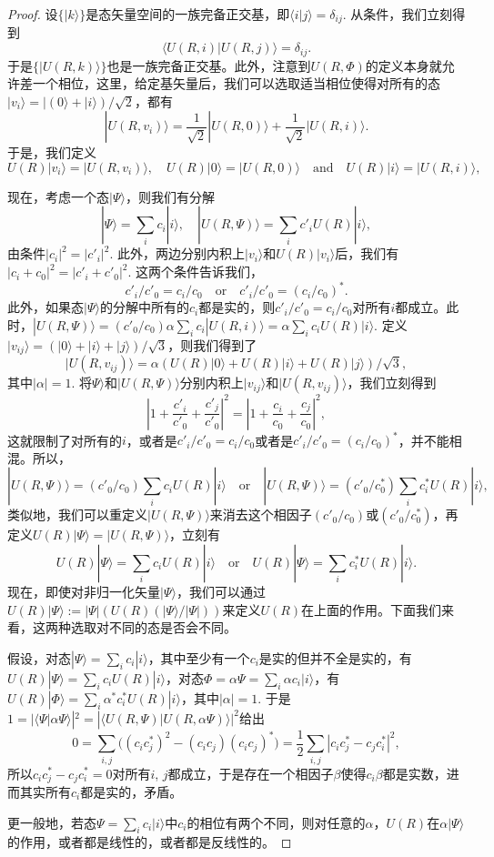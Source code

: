 \documentclass{article}
\theoremstyle{definition}
\theoremstyle{plain}
\begin{document}
\begin{proof}
	设$\{|k\rangle\}$是态矢量空间的一族完备正交基，即$\langle i|j\rangle=\delta_{ij}$. 从条件，我们立刻得到
	\[
		\langle U(R,i)|U(R,j)\rangle=\delta_{ij}.
	\]
	于是$\{|U(R,k)\rangle\}$也是一族完备正交基。此外，注意到$U(R,\Phi)$的定义本身就允许差一个相位，这里，给定基矢量后，我们可以选取适当相位使得对所有的态$|v_i\rangle=|(0\rangle+|i\rangle)/\sqrt 2$，都有
	\[
		|U(R,v_i)\rangle = \frac{1}{\sqrt{2}}|U(R,0)\rangle+\frac{1}{\sqrt{2}}|U(R,i)\rangle.
	\]
	于是，我们定义
	\[
		U(R)|v_i\rangle = |U(R,v_i)\rangle,\quad U(R)|0\rangle =|U(R,0)\rangle\quad  \text{and}\quad 
		U(R)|i\rangle = |U(R,i)\rangle,
	\]

	现在，考虑一个态$|\Psi\rangle$，则我们有分解
	\[
		|\Psi\rangle=\sum_i c_i |i\rangle,\quad |U(R,\Psi)\rangle=\sum_i c'_i U(R)|i\rangle,
	\]
	由条件$|c_i|^2=|c'_i|^2$. 此外，两边分别内积上$|v_i\rangle$和$U(R)|v_i\rangle$后，我们有$|c_i+c_0|^2=|c'_i+c'_0|^2$. 这两个条件告诉我们，
	\[
		c'_i/c'_0=c_i/c_0\quad \text{or}\quad c'_i/c'_0=(c_i/c_0)^*.
	\]
	此外，如果态$|\Psi\rangle$的分解中所有的$c_i$都是实的，则$c'_i/c'_0=c_i/c_0$对所有$i$都成立。此时，$|U(R,\Psi)\rangle=(c'_0/c_0)\alpha\sum_i c_i|U(R,i)\rangle=\alpha\sum_i c_iU(R)|i\rangle$. 定义$|v_{ij}\rangle = (|0\rangle+|i\rangle+|j\rangle)/\sqrt{3}$，则我们得到了
	\[
		|U(R,v_{ij})\rangle=\alpha (U(R)|0\rangle+U(R)|i\rangle+U(R)|j\rangle)/\sqrt{3},
	\]
	其中$|\alpha|=1$. 将$\Psi\rangle$和$|U(R,\Psi)\rangle$分别内积上$|v_{ij}\rangle$和$|U(R,v_{ij})\rangle$，我们立刻得到
	\[
		\left|1+\frac{c'_i}{c'_0}+\frac{c'_j}{c'_0}\right|^2=\left|1+\frac{c_i}{c_0}+\frac{c_j}{c_0}\right|^2,
	\]
	这就限制了对所有的$i$，或者是$c'_i/c'_0=c_i/c_0$或者是$c'_i/c'_0=(c_i/c_0)^*$，并不能相混。所以，
	\[
		|U(R,\Psi)\rangle=(c'_0/c_0)\sum_i c_i U(R)|i\rangle\quad \text{or}\quad |U(R,\Psi)\rangle=(c'_0/c^*_0)\sum_i c^*_i U(R)|i\rangle,
	\]
	类似地，我们可以重定义$|U(R,\Psi)\rangle$来消去这个相因子$(c'_0/c_0)$或$(c'_0/c^*_0)$，再定义$U(R)|\Psi\rangle=|U(R,\Psi)\rangle$，立刻有
	\[
		U(R)|\Psi\rangle=\sum_i c_i U(R)|i\rangle\quad \text{or}\quad U(R)|\Psi\rangle=\sum_i c^*_i U(R)|i\rangle.
	\]
	现在，即使对非归一化矢量$|\Psi\rangle$，我们可以通过$U(R)|\Psi\rangle:=|\Psi|(U(R)(|\Psi\rangle/|\Psi|))$来定义$U(R)$在上面的作用。下面我们来看，这两种选取对不同的态是否会不同。

	假设，对态$|\Psi\rangle =\sum_i c_i |i\rangle$，其中至少有一个$c_i$是实的但并不全是实的，有$U(R)|\Psi\rangle=\sum_i c_i U(R)|i\rangle$，对态$\Phi=\alpha\Psi=\sum_i \alpha c_i|i\rangle$，有$U(R)|\Phi\rangle=\sum_i \alpha^* c^*_i U(R)|i\rangle$，其中$|\alpha|=1$. 于是$1=|\langle \Psi|\alpha\Psi\rangle|^2=|\langle U(R,\Psi)|U(R,\alpha\Psi)\rangle|^2$给出
	\[
		0=\sum_{i,j} \bigl((c_ic_j^*)^2-(c_ic_j)(c_ic_j)^*\bigr)=\frac{1}{2}\sum_{i,j}|c_ic_j^*-c_jc_i^*|^2,
	\]
	所以$c_ic_j^*-c_jc_i^*=0$对所有$i$, $j$都成立，于是存在一个相因子$\beta$使得$c_i\beta$都是实数，进而其实所有$c_i$都是实的，矛盾。

	更一般地，若态$\Psi=\sum_i c_i |i\rangle$中$c_i$的相位有两个不同，则对任意的$\alpha$，$U(R)$在$\alpha|\Psi\rangle$的作用，或者都是线性的，或者都是反线性的。
	
\end{proof}
\end{document}

